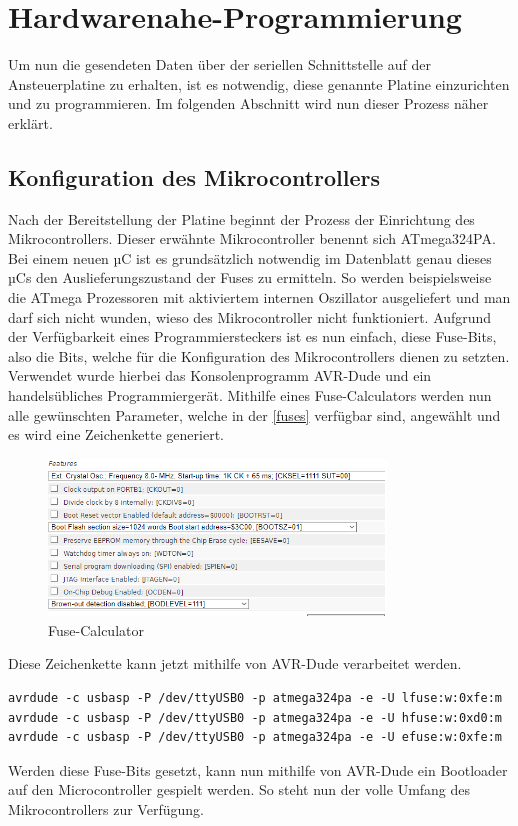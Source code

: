\section{Hardwarenahe-Programmierung}
Um nun die gesendeten Daten über der seriellen Schnittstelle auf der Ansteuerplatine zu erhalten, ist es notwendig, diese genannte Platine einzurichten und zu programmieren.
Im folgenden Abschnitt wird nun dieser Prozess näher erklärt.
\subsection{Konfiguration des Mikrocontrollers}
Nach der Bereitstellung der Platine beginnt der Prozess der Einrichtung des Mikrocontrollers.
Dieser erwähnte Mikrocontroller benennt sich ATmega324PA.
Bei einem neuen µC ist es grundsätzlich notwendig im Datenblatt genau dieses µCs den Auslieferungszustand der Fuses zu ermitteln.
So werden beispielsweise die ATmega Prozessoren mit aktiviertem internen Oszillator ausgeliefert und man darf sich nicht wunden, wieso des Mikrocontroller nicht funktioniert.
Aufgrund der Verfügbarkeit eines Programmiersteckers ist es nun einfach, diese Fuse-Bits, also die Bits, welche für die Konfiguration des Mikrocontrollers dienen zu setzten.
Verwendet wurde hierbei das Konsolenprogramm AVR-Dude und ein handelsübliches Programmiergerät.
Mithilfe eines Fuse-Calculators werden nun alle gewünschten Parameter, welche in der \autoref{fuses} verfügbar sind, angewählt und es wird eine Zeichenkette generiert.
\begin{figure}[H]
\centering
\includegraphics[width=0.8\textwidth]{fig/ainf/Features.PNG}
\caption{Fuse-Calculator}
\label{fuses}
\end{figure}
Diese Zeichenkette kann jetzt mithilfe von AVR-Dude verarbeitet werden.
\begin{lstlisting}[style=java,caption=Java-Codebeispiel,label=resource]
avrdude -c usbasp -P /dev/ttyUSB0 -p atmega324pa -e -U lfuse:w:0xfe:m
avrdude -c usbasp -P /dev/ttyUSB0 -p atmega324pa -e -U hfuse:w:0xd0:m
avrdude -c usbasp -P /dev/ttyUSB0 -p atmega324pa -e -U efuse:w:0xfe:m
\end{lstlisting}
Werden diese Fuse-Bits gesetzt, kann nun mithilfe von AVR-Dude ein Bootloader auf den Microcontroller gespielt werden.
So steht nun der volle Umfang des Mikrocontrollers zur Verfügung.
